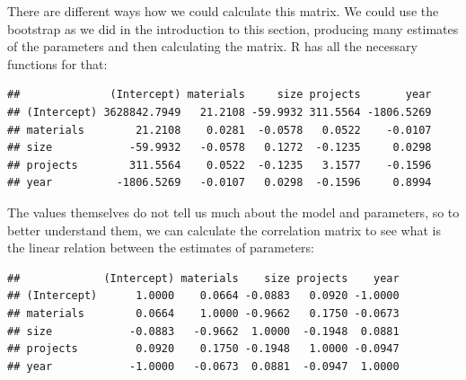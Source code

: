 \documentclass[
]{book}
\newenvironment{Shaded}{\begin{snugshade}}{\end{snugshade}}
\newcommand{\DecValTok}[1]{\textcolor[rgb]{0.00,0.00,0.81}{#1}}
\newcommand{\FunctionTok}[1]{\textcolor[rgb]{0.13,0.29,0.53}{\textbf{#1}}}
\newcommand{\NormalTok}[1]{#1}
\newcommand{\SpecialCharTok}[1]{\textcolor[rgb]{0.81,0.36,0.00}{\textbf{#1}}}
\theoremstyle{definition}
\theoremstyle{definition}
\theoremstyle{definition}
\theoremstyle{definition}
\theoremstyle{remark}
\begin{document}
There are different ways how we could calculate this matrix. We could use the bootstrap as we did in the introduction to this section, producing many estimates of the parameters and then calculating the matrix. R has all the necessary functions for that:

\begin{Shaded}
\end{Shaded}

\begin{verbatim}
##              (Intercept) materials     size projects       year
## (Intercept) 3628842.7949   21.2108 -59.9932 311.5564 -1806.5269
## materials        21.2108    0.0281  -0.0578   0.0522    -0.0107
## size            -59.9932   -0.0578   0.1272  -0.1235     0.0298
## projects        311.5564    0.0522  -0.1235   3.1577    -0.1596
## year          -1806.5269   -0.0107   0.0298  -0.1596     0.8994
\end{verbatim}

The values themselves do not tell us much about the model and parameters, so to better understand them, we can calculate the correlation matrix to see what is the linear relation between the estimates of parameters:

\begin{Shaded}
\end{Shaded}

\begin{verbatim}
##             (Intercept) materials    size projects    year
## (Intercept)      1.0000    0.0664 -0.0883   0.0920 -1.0000
## materials        0.0664    1.0000 -0.9662   0.1750 -0.0673
## size            -0.0883   -0.9662  1.0000  -0.1948  0.0881
## projects         0.0920    0.1750 -0.1948   1.0000 -0.0947
## year            -1.0000   -0.0673  0.0881  -0.0947  1.0000
\end{verbatim}
\end{document}

